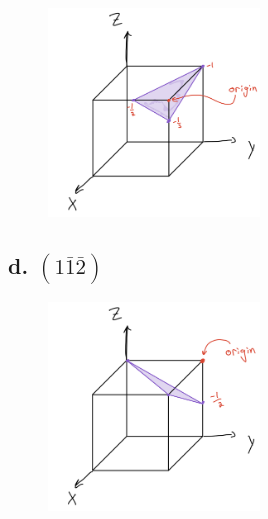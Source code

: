 \documentclass{article}
\begin{document}
\begin{figure}[H]
    \centering
    \includegraphics[width=0.5\textwidth]{4c.png}
\end{figure}

\subsection*{d. \small $(1\bar{1}\bar{2})$}

\begin{figure}[H]
    \centering
    \includegraphics[width=0.5\textwidth]{4d.png}
\end{figure}
\end{document}
